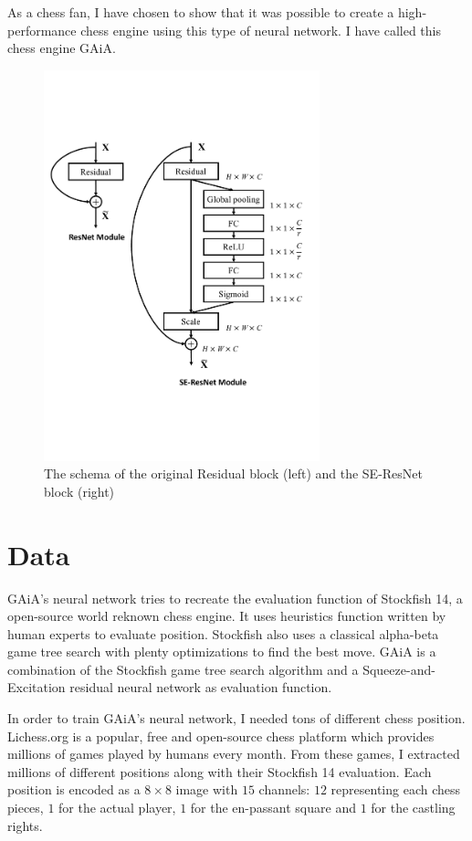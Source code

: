 \documentclass[a4paper]{article}
\begin{document}
As a chess fan, I have chosen to show that it was possible to create a
high-performance chess engine using this type of neural network.
I have called this chess engine GAiA.

\begin{figure}[!]
  \centering
  \includegraphics[width=8cm]{module_seresnet.pdf}
  \caption{The schema of the original Residual block (left) and the SE-ResNet
  block (right)}
  \label{fig:seblock}
\end{figure}

\section{Data}
GAiA's neural network tries to recreate the evaluation function of Stockfish 14,
a open-source world reknown chess engine. It uses heuristics function written
by human experts to evaluate position. Stockfish also uses a classical
alpha-beta game tree search with plenty optimizations to find the best move.
GAiA is a combination of the Stockfish game tree search algorithm and a
Squeeze-and-Excitation residual neural network as evaluation function.

In order to train GAiA's neural network, I needed tons of different
chess position. Lichess.org\cite{lichess} is a popular, free and open-source
chess platform which provides millions of games played by humans every month.
From these games, I extracted millions of different positions along with their
Stockfish 14 evaluation.
Each position is encoded as a $8\times8$ image with $15$ channels: 
$12$ representing each chess pieces, $1$ for the actual player, $1$
for the en-passant square and $1$ for the castling rights.
\end{document}
